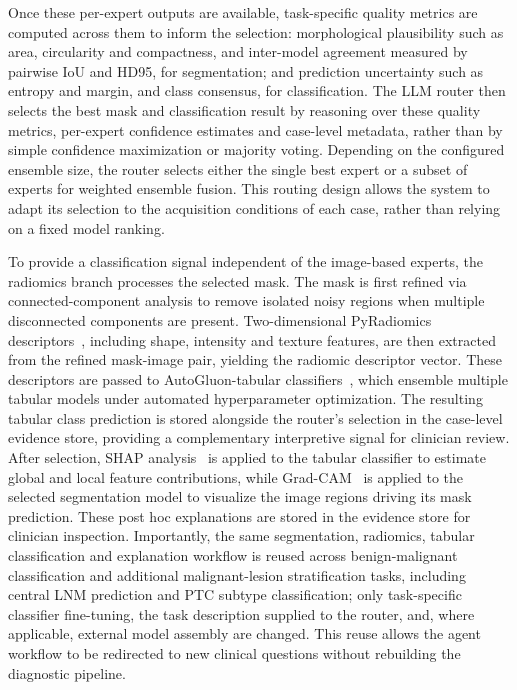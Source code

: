 \documentclass[fleqn,10pt]{wlscirep}
\begin{document}
Once these per-expert outputs are available, task-specific quality metrics are computed across them to inform the selection: morphological plausibility such as area, circularity and compactness, and inter-model agreement measured by pairwise IoU and HD95, for segmentation; and prediction uncertainty such as entropy and margin, and class consensus, for classification. The LLM router then selects the best mask and classification result by reasoning over these quality metrics, per-expert confidence estimates and case-level metadata, rather than by simple confidence maximization or majority voting. Depending on the configured ensemble size, the router selects either the single best expert or a subset of experts for weighted ensemble fusion. This routing design allows the system to adapt its selection to the acquisition conditions of each case, rather than relying on a fixed model ranking.

To provide a classification signal independent of the image-based experts, the radiomics branch processes the selected mask. The mask is first refined via connected-component analysis to remove isolated noisy regions when multiple disconnected components are present. Two-dimensional PyRadiomics descriptors~\cite{van2017computational}, including shape, intensity and texture features, are then extracted from the refined mask-image pair, yielding the radiomic descriptor vector. These descriptors are passed to AutoGluon-tabular classifiers~\cite{erickson2020autogluon}, which ensemble multiple tabular models under automated hyperparameter optimization. The resulting tabular class prediction is stored alongside the router's selection in the case-level evidence store, providing a complementary interpretive signal for clinician review. After selection, SHAP analysis~\cite{lundberg2017unified} is applied to the tabular classifier to estimate global and local feature contributions, while Grad-CAM~\cite{selvaraju2017gradcam} is applied to the selected segmentation model to visualize the image regions driving its mask prediction. These post hoc explanations are stored in the evidence store for clinician inspection. Importantly, the same segmentation, radiomics, tabular classification and explanation workflow is reused across benign-malignant classification and additional malignant-lesion stratification tasks, including central LNM prediction and PTC subtype classification; only task-specific classifier fine-tuning, the task description supplied to the router, and, where applicable, external model assembly are changed. This reuse allows the agent workflow to be redirected to new clinical questions without rebuilding the diagnostic pipeline.
\end{document}
